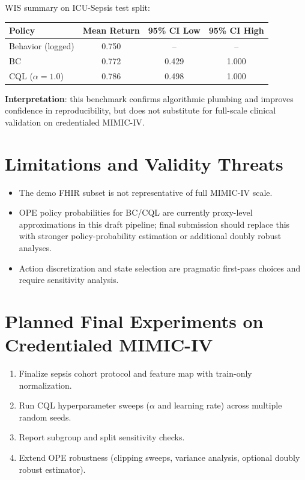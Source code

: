 \documentclass[10pt]{article}
\begin{document}
WIS summary on ICU-Sepsis test split:
\begin{center}
\begin{tabular}{lccc}
\toprule
Policy & Mean Return & 95\% CI Low & 95\% CI High \\
\midrule
Behavior (logged) & 0.750 & -- & -- \\
BC & 0.772 & 0.429 & 1.000 \\
CQL ($\alpha=1.0$) & 0.786 & 0.498 & 1.000 \\
\bottomrule
\end{tabular}
\end{center}

\textbf{Interpretation}: this benchmark confirms algorithmic plumbing and improves confidence in reproducibility, but does not substitute for full-scale clinical validation on credentialed MIMIC-IV.

\section{Limitations and Validity Threats}
\begin{itemize}[leftmargin=*]
  \item The demo FHIR subset is not representative of full MIMIC-IV scale.
  \item OPE policy probabilities for BC/CQL are currently proxy-level approximations in this draft pipeline; final submission should replace this with stronger policy-probability estimation or additional doubly robust analyses.
  \item Action discretization and state selection are pragmatic first-pass choices and require sensitivity analysis.
\end{itemize}

\section{Planned Final Experiments on Credentialed MIMIC-IV}
\begin{enumerate}[leftmargin=*]
  \item Finalize sepsis cohort protocol and feature map with train-only normalization.
  \item Run CQL hyperparameter sweeps ($\alpha$ and learning rate) across multiple random seeds.
  \item Report subgroup and split sensitivity checks.
  \item Extend OPE robustness (clipping sweeps, variance analysis, optional doubly robust estimator).
\end{enumerate}
\end{document}
